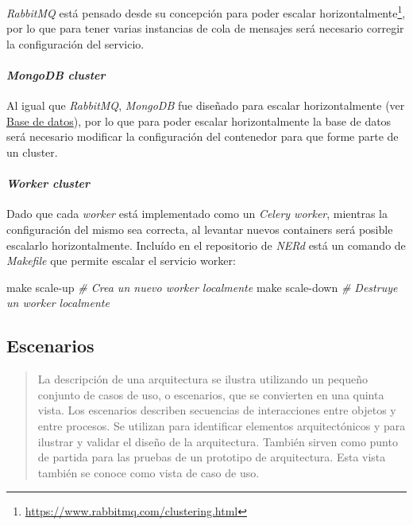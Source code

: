 \documentclass[12pt,a4paper,]{scrartcl}
\newenvironment{Shaded}{\begin{snugshade}}{\end{snugshade}}
\newcommand{\CommentTok}[1]{\textcolor[rgb]{0.56,0.35,0.01}{\textit{#1}}}
\newcommand{\FunctionTok}[1]{\textcolor[rgb]{0.00,0.00,0.00}{#1}}
\newcommand{\NormalTok}[1]{#1}
\let\oldparagraph\paragraph
\renewcommand{\paragraph}[1]{\oldparagraph{#1}\mbox{}}
\let\rmarkdownfootnote\footnote%
\def\footnote{\protect\rmarkdownfootnote}
\begin{document}
\emph{RabbitMQ} está pensado desde su concepción para poder escalar horizontalmente\footnote{\url{https://www.rabbitmq.com/clustering.html}}, por lo que para tener varias instancias de cola de mensajes será necesario corregir la configuración del servicio.

\hypertarget{mongodb-cluster}{%
\paragraph{\texorpdfstring{\emph{MongoDB cluster}}{MongoDB cluster}}\label{mongodb-cluster}}

Al igual que \emph{RabbitMQ}, \emph{MongoDB} fue diseñado para escalar horizontalmente (ver \protect\hyperlink{MongoDBDev}{Base de datos}), por lo que para poder escalar horizontalmente la base de datos será necesario modificar la configuración del contenedor para que forme parte de un cluster.

\hypertarget{worker-cluster}{%
\paragraph{\texorpdfstring{\emph{Worker cluster}}{Worker cluster}}\label{worker-cluster}}

Dado que cada \emph{worker} está implementado como un \emph{Celery worker}, mientras la configuración del mismo sea correcta, al levantar nuevos containers será posible escalarlo horizontalmente. Incluído en el repositorio de \emph{NERd} está un comando de \emph{Makefile} que permite escalar el servicio worker:

\begin{Shaded}
\begin{Highlighting}[]
\FunctionTok{make}\NormalTok{ scale-up }\CommentTok{# Crea un nuevo worker localmente}
\FunctionTok{make}\NormalTok{ scale-down }\CommentTok{# Destruye un worker localmente}
\end{Highlighting}
\end{Shaded}

\hypertarget{escenarios}{%
\subsection{Escenarios}\label{escenarios}}

\begin{quote}
La descripción de una arquitectura se ilustra utilizando un pequeño conjunto de casos de uso, o escenarios, que se convierten en una quinta vista.
Los escenarios describen secuencias de interacciones entre objetos y entre procesos.
Se utilizan para identificar elementos arquitectónicos y para ilustrar y validar el diseño de la arquitectura.
También sirven como punto de partida para las pruebas de un prototipo de arquitectura.
Esta vista también se conoce como vista de caso de uso.
\end{quote}
\end{document}
